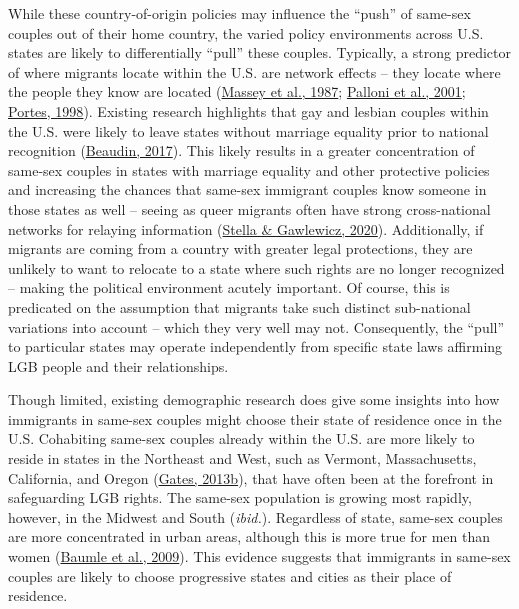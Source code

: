 \documentclass[
  11pt,
]{article}
\begin{document}
While these country-of-origin policies may influence the ``push'' of same-sex couples out of their home country, the varied policy environments across U.S. states are likely to differentially ``pull'' these couples. Typically, a strong predictor of where migrants locate within the U.S. are network effects -- they locate where the people they know are located (\protect\hyperlink{ref-massey_1987}{Massey et al., 1987}; \protect\hyperlink{ref-palloni_2001}{Palloni et al., 2001}; \protect\hyperlink{ref-portes_1998}{Portes, 1998}). Existing research highlights that gay and lesbian couples within the U.S. were likely to leave states without marriage equality prior to national recognition (\protect\hyperlink{ref-beaudin_2017}{Beaudin, 2017}). This likely results in a greater concentration of same-sex couples in states with marriage equality and other protective policies and increasing the chances that same-sex immigrant couples know someone in those states as well -- seeing as queer migrants often have strong cross-national networks for relaying information (\protect\hyperlink{ref-stella_2020}{Stella \& Gawlewicz, 2020}). Additionally, if migrants are coming from a country with greater legal protections, they are unlikely to want to relocate to a state where such rights are no longer recognized -- making the political environment acutely important. Of course, this is predicated on the assumption that migrants take such distinct sub-national variations into account -- which they very well may not. Consequently, the ``pull'' to particular states may operate independently from specific state laws affirming LGB people and their relationships.

Though limited, existing demographic research does give some insights into how immigrants in same-sex couples might choose their state of residence once in the U.S. Cohabiting same-sex couples already within the U.S. are more likely to reside in states in the Northeast and West, such as Vermont, Massachusetts, California, and Oregon (\protect\hyperlink{ref-gates_2013a}{Gates, 2013b}), that have often been at the forefront in safeguarding LGB rights. The same-sex population is growing most rapidly, however, in the Midwest and South (\emph{ibid.}). Regardless of state, same-sex couples are more concentrated in urban areas, although this is more true for men than women (\protect\hyperlink{ref-baumle_2009}{Baumle et al., 2009}). This evidence suggests that immigrants in same-sex couples are likely to choose progressive states and cities as their place of residence.
\end{document}
